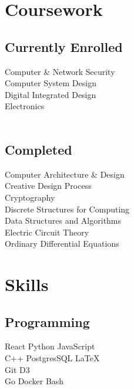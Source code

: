 \documentclass[letterpaper]{deedy-resume} %
\begin{document}
\begin{minipage}[t]{0.33\textwidth}
\section{Coursework} 
\subsection{Currently Enrolled}

Computer \& Network Security \\
Computer System Design \\
Digital Integrated Design \\
Electronics \\ \ \\

\subsection{Completed}
Computer Architecture \& Design \\
Creative Design Process \\
Cryptography \\
Discrete Structures for Computing \\
Data Structures and Algorithms \\
Electric Circuit Theory \\
Ordinary Differential Equations

\sectionspace %


\section{Skills}

\subsection{Programming}

\textbullet{} React \textbullet{} Python \textbullet{} JavaScript \\
\textbullet{} C++ \textbullet{} PostgresSQL \textbullet{} \LaTeX\ \\
\textbullet{} Git \textbullet{} D3 \\
\textbullet{} Go  \textbullet{} Docker \textbullet{} Bash


\end{minipage}
\end{document}
